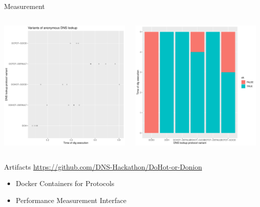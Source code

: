 \documentclass[xcolor=x11names,dvipsnames,aspectratio=169]{beamer}
\begin{document}
    \begin{frame}{Measurement}
        \begin{columns}
            \begin{column}{.5\textwidth}
                \includegraphics[width=\textwidth]{img/p1.pdf}
            \end{column}
            \begin{column}{.5\textwidth}
                \includegraphics[width=\textwidth]{img/p2.pdf}
            \end{column}
        \end{columns}
    \end{frame}

    \begin{frame}{Artifacts}
        \url{https://github.com/DNS-Hackathon/DoHot-or-Donion}
        \begin{itemize}
            \item Docker Containers for Protocols
            \item Performance Measurement Interface
        \end{itemize}
    \end{frame}
\end{document}
